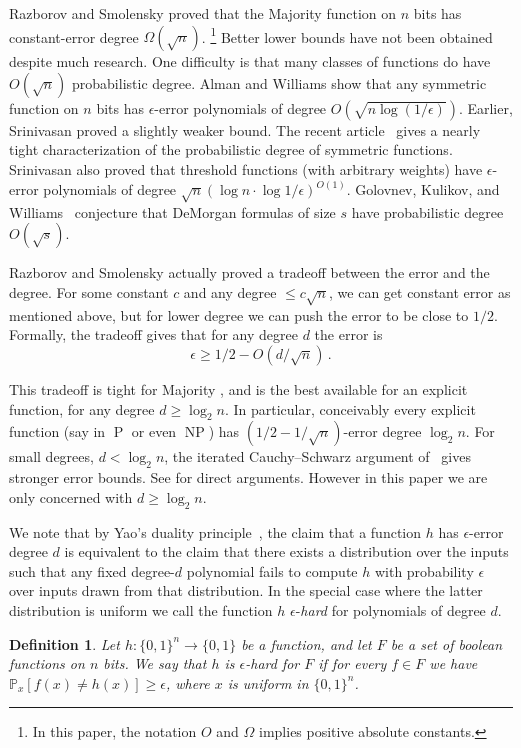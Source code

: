 \documentclass[11pt]{article}
\newtheorem{defn}[theorem]{Definition}
\DeclareMathOperator{\NP}{\mathrm{NP}}  %
\DeclareMathOperator{\PPP}{\mathrm{P}}  %
\newcommand{\zo}{\{0, 1\}}
\renewcommand{\P}{\mathbb{P}}
\newcommand{\e}{\epsilon}
\begin{document}
%
%
Razborov and Smolensky \cite{Raz87,Smo87,Smolensky93} proved
that the Majority function on $n$ bits has constant-error degree
$\Omega(\sqrt{n})$.%
%
%
\footnote{In this paper, %
the notation $O$ and $\Omega$ %
implies positive %
absolute constants.}
Better lower bounds have not been obtained despite much
research. One difficulty is that many classes of functions do have
$O(\sqrt{n})$ probabilistic degree.
Alman and Williams
%
show \cite[Theorem 1.2]{DBLP:conf/focs/AlmanW15}   %
that any symmetric function on $n$ bits has $\e$-error
polynomials of degree $O(\sqrt{n\log(1/\e)})$. Earlier, Srinivasan
\cite{DBLP:conf/fsttcs/Srinivasan13} proved a slightly weaker bound.
The recent %
article~\cite{srinivasan2019probabilistic}  %
gives a nearly
tight characterization of the probabilistic degree of symmetric functions.
Srinivasan %
\cite[Theorem 12]{DBLP:conf/fsttcs/Srinivasan13}  %
also
proved that threshold functions (with arbitrary weights) have $\e$-error
polynomials of degree 
$\sqrt{n}(\log n\cdot\log1/\e)^{O(1)}$.
Golovnev, Kulikov, and Williams~%
%
\cite{DBLP:journals/eccc/GolovnevKW18}
conjecture that DeMorgan formulas of size $s$ have probabilistic
degree $O(\sqrt{s})$. %
%
%

\medskip

Razborov and Smolensky actually proved a tradeoff between the error
and the degree.
%
%
%
%
For some constant $c$ and any degree $\le c \sqrt{n}$, %
%
%
%
%
%
%
%
we can get constant error as mentioned above,
but for lower degree we can push the error
to be close to $1/2$. Formally, the tradeoff gives that for any
degree $d$ the error is
\begin{equation}
%
%
%
\e\ge1/2- O(d/\sqrt{n})\,.\label{eq:smolensky}   %
\end{equation}
%
%
%
%

This tradeoff is tight for Majority %
\cite{Viola-L12requiresCor},  %
and is
the best available for an explicit function, for any degree $d\ge\log_{2}n$.
In particular, conceivably every explicit function (say in $\PPP$ or
even $\NP$) has %
$(1/2-1/\sqrt{n})$-error %
degree $\log_{2}n$.
%
For small degrees, $d<\log_{2}n$, the iterated Cauchy--Schwarz argument
of~\cite{BNS92} gives stronger error bounds.   %
%
%
%
%
%
%
%
See \cite{ViolaGF2,ViW-GF2,viola-FTTCS09}
for direct arguments.  %
%
However in this paper we are only concerned with $d\ge\log_{2}n$.

We note that by Yao's duality principle~\cite{DBLP:conf/focs/Yao77},
the claim that a function $h$ has $\e$-error degree $d$ is equivalent
to the claim that there exists a distribution over the inputs such
that any fixed degree-$d$ polynomial fails to compute $h$ with probability
$\e$ over inputs drawn from that distribution. In the special case
where the latter distribution is uniform we call the function $h$
$\e$-\emph{hard }for polynomials of degree $d$.
\begin{defn}
\label{def:hardness}Let $h:\zo^{n}\to\zo$ be a function, and let
$F$ be a set of boolean functions on $n$ bits. We say that $h$
is $\e$-hard for $F$ if for every $f\in F$ we have $\P_{x}[f(x)\ne h(x)]\ge\e$,
where $x$ is uniform in $\zo^{n}$.
\end{defn}
\end{document}
